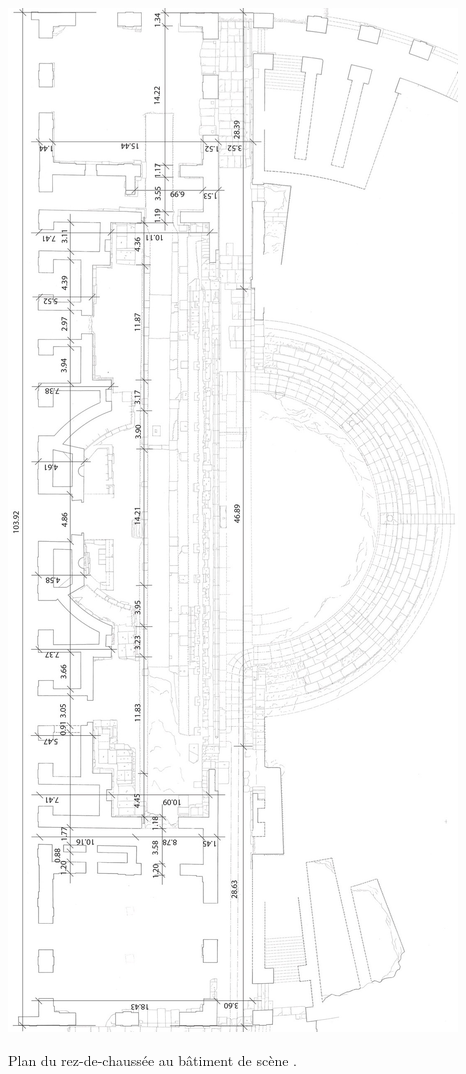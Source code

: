 	
\begin{figureth}
	\includegraphics[height=0.8\paperheight]{images/cotes}
	\caption[Plan du rez-de-chaussée au bâtiment de scène.]{Plan du rez-de-chaussée au bâtiment de scène \footnotemark.}
	\label{cotes} 
\end{figureth}

